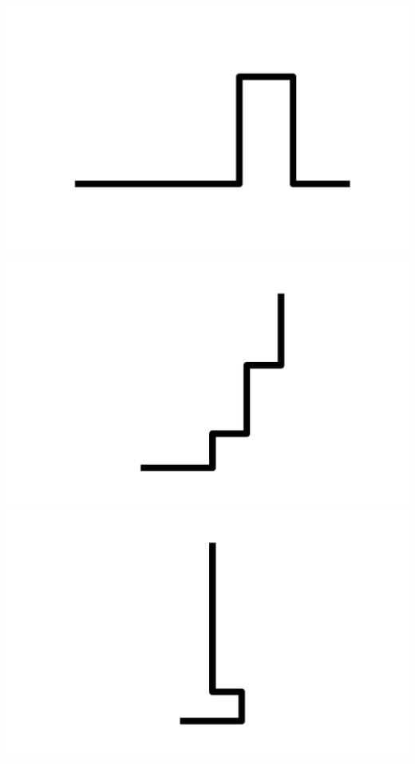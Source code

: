 \documentclass[]{report}
\begin{document}
\includegraphics[scale=.1]{pictures/21/state_cluster_shapes_454.pdf} 
\includegraphics[scale=.1]{pictures/21/state_cluster_shapes_455.pdf} 
\includegraphics[scale=.1]{pictures/21/state_cluster_shapes_456.pdf} 
\end{document}
